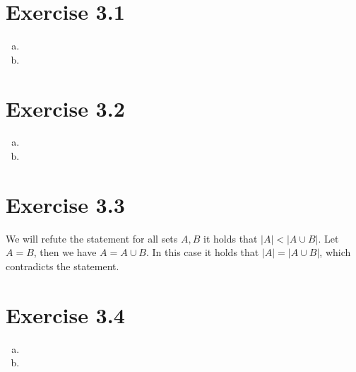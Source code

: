 \documentclass{article} %
\newcommand{\homeworkNumber}{3}
\begin{document}
\section*{Exercise \homeworkNumber.1}

\begin{enumerate}[(a)]
	\item
	\item
\end{enumerate}



\section*{Exercise \homeworkNumber.2}

\begin{enumerate}[(a)]
	\item
	\item
\end{enumerate}



\section*{Exercise \homeworkNumber.3}
We will refute the statement for all sets \( A,B \) it holds that \( |A| < |A \cup B| \). Let \( A = B \), then we have \( A = A \cup B \). In this case it holds that \( |A| = |A \cup B| \), which contradicts the statement.



\section*{Exercise \homeworkNumber.4}

\begin{enumerate}[(a)]
	\item
	\item
\end{enumerate}
\end{document}

